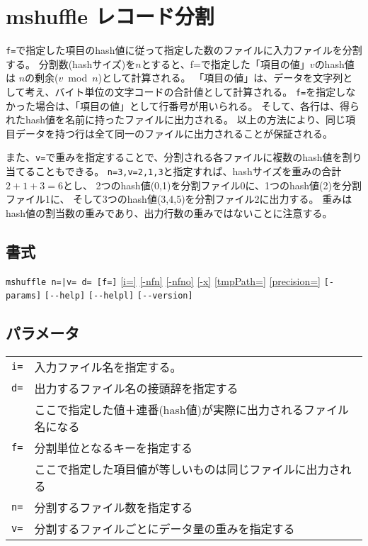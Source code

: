 
%

\section{mshuffle レコード分割\label{sect:mshuffle}}
\verb|f=|で指定した項目のhash値に従って指定した数のファイルに入力ファイルを分割する。
分割数(hashサイズ)を$n$とすると、f=で指定した「項目の値」$v$のhash値は
$n$の剰余($v$\ mod\ $n$)として計算される。
「項目の値」は、データを文字列として考え、バイト単位の文字コードの合計値として計算される。
\verb|f=|を指定しなかった場合は、「項目の値」として行番号が用いられる。
そして、各行は、得られたhash値を名前に持ったファイルに出力される。
以上の方法により、同じ項目データを持つ行は全て同一のファイルに出力されることが保証される。

また、\verb|v=|で重みを指定することで、分割される各ファイルに複数のhash値を割り当てることもできる。
\verb|n=3,v=2,1,3|と指定すれば、hashサイズを重みの合計$2+1+3=6$とし、
2つのhash値(0,1)を分割ファイル0に、1つのhash値(2)を分割ファイル1に、
そして3つのhash値(3,4,5)を分割ファイル2に出力する。
重みはhash値の割当数の重みであり、出力行数の重みではないことに注意する。

\subsection*{書式}
\verb/mshuffle n=|v= d= [f=]/
\hyperref[sect:option_i]{[i=]}
\hyperref[sect:option_nfn]{[-nfn]} 
\hyperref[sect:option_nfno]{[-nfno]}  
\hyperref[sect:option_x]{[-x]}
\hyperref[sect:option_tmpPath]{[tmpPath=]} 
\hyperref[sect:option_precision]{[precision=]}
\verb|[-params]|
\verb|[--help]|
\verb|[--helpl]|
\verb|[--version]|\\

\subsection*{パラメータ}
\begin{table}[htbp]
{\small
\begin{tabular}{ll}
\verb|i=|      & 入力ファイル名を指定する。\\
\verb|d=|      & 出力するファイル名の接頭辞を指定する\\
               & ここで指定した値＋連番(hash値)が実際に出力されるファイル名になる\\
\verb|f=|      & 分割単位となるキーを指定する\\
               & ここで指定した項目値が等しいものは同じファイルに出力される\\
\verb|n=|      & 分割するファイル数を指定する\\
\verb|v=|      & 分割するファイルごとにデータ量の重みを指定する\\
\end{tabular} 
}
\end{table} 

